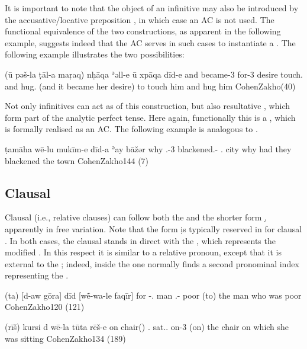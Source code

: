 It is important to note that the object of an infinitive may also be introduced by the accusative/locative preposition  \citep[see][96]{SabarDictionary}, in which case an AC is not used. The  functional equivalence of the two constructions, as apparent in the following example, suggests indeed that the AC serves in such cases to instantiate a .
The following example illustrates the two possibilities:

{(ū\cb{} pəš-la ṭāl-a maṛaq) nḥāqa ʾəll-e ū xpāqa dīd-e}
{and\cb{} became-3\fem{} for-3\fem{} desire touch.\inf{} \masc{} and hug.\inf{} \masc}
{(and it became her desire) to touch him and hug him}
{CohenZakho}{(40)}

Not only infinitives can act as \prims of this construction, but also resultative , which form part of the analytic perfect tense. Here again, functionally this is a , which is formally realised as an AC. The following example is analogous to .

{ṭamāha wē-lu mukīm-e dīd-a ʾay bāžər}
{why \cop.\pst{}-3\pl{} blackened.\resl-\pl{} \fem{} .\fem{} city}
{why  had  they blackened the town}
{CohenZakho}{144 (7)}

\subsection{Clausal \secns} \label{ss:JZax_lnk_clause}
\largerpage
Clausal \secns (i.e., relative clauses) can follow both the \lnk* {} and the shorter form \d, apparently in free variation.  Note that the form \d is typically reserved in \JZax for clausal \secns.  
In both cases, the clausal \secn  stands in direct  with the \lnk*, which represents the modified \prim. In this respect it is similar to a relative pronoun, except that it is external to the ; indeed, inside the  one normally finds a second pronominal index representing the \prim.


{(ta) [d-aw gōra] dīd [wḗ-wa-le faqīr]}
{for \gen-.\masc{} man \lnkd{} \cop.\pst-\masc{} poor}
{(to) the man who was poor}
{CohenZakho}{120 (121)}

{(rīš) kursi d\cb{} wē-la tūta rēš-e}
	{on chair(\masc) \lnk\cb{} \cop.\fem{} sat.\resl.\fem{} on-3\masc{}}
{(on) the chair on which she was sitting}
{CohenZakho}{134 (189)}

